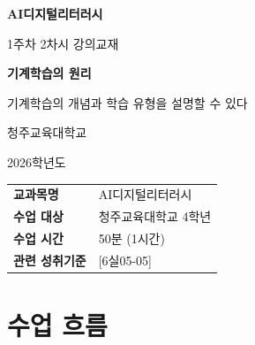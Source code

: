 \documentclass[11pt,a4paper]{article}
\begin{document}
\begin{titlepage}
\centering
\vspace*{3cm}

{\Huge\bfseries\color{primary} AI디지털리터러시}

\vspace{0.5cm}

{\LARGE\color{darkblue} 1주차 2차시 강의교재}

\vspace{1.5cm}

{\Huge\bfseries 기계학습의 원리}

\vspace{0.5cm}

{\Large\color{darkgray} 기계학습의 개념과 학습 유형을 설명할 수 있다}

\vspace{3cm}

{\large 청주교육대학교}

\vspace{0.3cm}

{\large 2026학년도}

\vspace{2cm}

\begin{tcolorbox}[colback=lightblue, colframe=primary, width=0.8\textwidth, halign=center]
\begin{tabular}{ll}
\textbf{교과목명} & AI디지털리터러시 \\
\textbf{수업 대상} & 청주교육대학교 4학년 \\
\textbf{수업 시간} & 50분 (1시간) \\
\textbf{관련 성취기준} & {[6실05-05]} \\
\end{tabular}
\end{tcolorbox}

\end{titlepage}

\tableofcontents
\newpage

\section*{ 수업 흐름}
\end{document}
